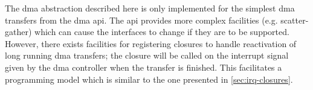 The \gls{dma} abstraction described here is only implemented for the simplest \gls{dma} transfers from the {\emlib} \gls{dma} \gls{api}.
The {\emlib} \gls{api} provides more complex facilities (e.g. scatter-gather) which can cause the interfaces to change if they are to be supported.
However, there exists facilities for registering closures to handle reactivation of long running \gls{dma} transfers; the closure will be called on the interrupt signal given by the \gls{dma} controller when the transfer is finished.
This facilitates a programming model which is similar to the one presented in \autoref{sec:irq-closures}.
